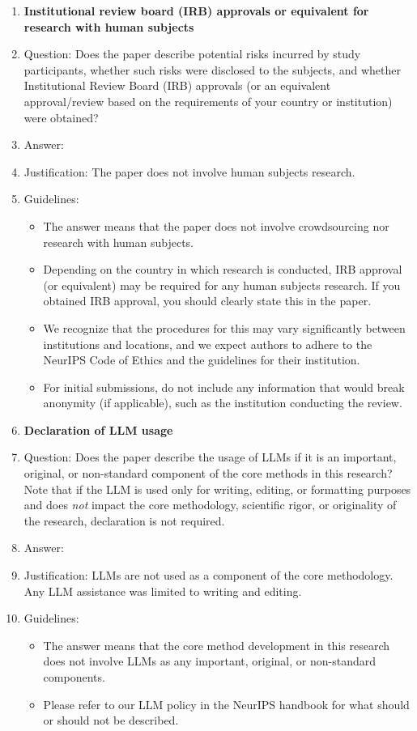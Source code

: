 \documentclass{article}
\begin{document}
\begin{enumerate}
\item {\bf Institutional review board (IRB) approvals or equivalent for research with human subjects}
    \item[] Question: Does the paper describe potential risks incurred by study participants, whether such risks were disclosed to the subjects, and whether Institutional Review Board (IRB) approvals (or an equivalent approval/review based on the requirements of your country or institution) were obtained?
    \item[] Answer: \answerNA{}
    \item[] Justification: The paper does not involve human subjects research.
    \item[] Guidelines:
    \begin{itemize}
        \item The answer \answerNA{} means that the paper does not involve crowdsourcing nor research with human subjects.
        \item Depending on the country in which research is conducted, IRB approval (or equivalent) may be required for any human subjects research. If you obtained IRB approval, you should clearly state this in the paper.
        \item We recognize that the procedures for this may vary significantly between institutions and locations, and we expect authors to adhere to the NeurIPS Code of Ethics and the guidelines for their institution.
        \item For initial submissions, do not include any information that would break anonymity (if applicable), such as the institution conducting the review.
    \end{itemize}

\item {\bf Declaration of LLM usage}
    \item[] Question: Does the paper describe the usage of LLMs if it is an important, original, or non-standard component of the core methods in this research? Note that if the LLM is used only for writing, editing, or formatting purposes and does \emph{not} impact the core methodology, scientific rigor, or originality of the research, declaration is not required.
    \item[] Answer: \answerNA{}
    \item[] Justification: LLMs are not used as a component of the core methodology. Any LLM assistance was limited to writing and editing.
    \item[] Guidelines:
    \begin{itemize}
        \item The answer \answerNA{} means that the core method development in this research does not involve LLMs as any important, original, or non-standard components.
        \item Please refer to our LLM policy in the NeurIPS handbook for what should or should not be described.
    \end{itemize}

\end{enumerate}
\end{document}
